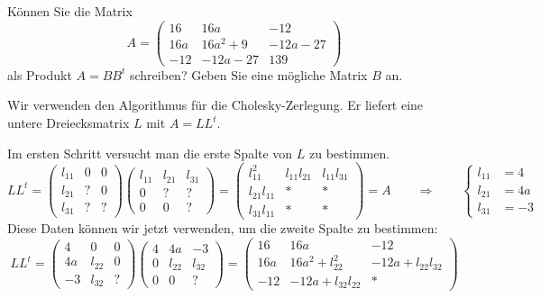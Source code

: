 Können Sie die Matrix
\[
A=\begin{pmatrix}
16& 16a&-12\\
16a&16a^2+9&-12a-27\\
-12& -12a-27&139
\end{pmatrix}
\]
als Produkt $A=BB^t$ schreiben? Geben Sie eine mögliche Matrix $B$ an.


\begin{loesung}
Wir verwenden den Algorithmus für die Cholesky-Zerlegung. Er liefert eine 
untere Dreiecksmatrix $L$ mit $A = LL^t$.

Im ersten Schritt versucht man die erste Spalte von $L$ zu bestimmen.
\[
LL^t=
\begin{pmatrix}
l_{11}&  0&  0\\
l_{21}&  ?&  0\\
l_{31}&  ?&  ?
\end{pmatrix}
\begin{pmatrix}
l_{11}&l_{21}&l_{31}\\
     0&     ?&     ?\\
     0&     0&     ?
\end{pmatrix}
=
\begin{pmatrix}
    l_{11}^2&l_{11}l_{21}&l_{11}l_{31}\\
l_{21}l_{11}&           *&           *\\
l_{31}l_{11}&           *&           *
\end{pmatrix}
=
A
\qquad\Rightarrow\qquad
\left\{
\begin{aligned}
l_{11}&=4\\
l_{21}&=4a\\
l_{31}&=-3
\end{aligned}
\right.
\]
Diese Daten können wir jetzt verwenden, um die zweite Spalte zu bestimmen:
\[
LL^t
=
\begin{pmatrix}
4&     0&0\\
4a&l_{22}&0\\
-3&l_{32}&?
\end{pmatrix}
\begin{pmatrix}
4&    4a&    -3\\
0&l_{22}&l_{32}\\
0&     0&?
\end{pmatrix}
=
\begin{pmatrix}
16&16a           &          -12\\
16a&16a^2+l_{22}^2  &-12a+l_{22}l_{32}\\
-12&-12a+l_{32}l_{22}&         *

\end{pmatrix}\]
\end{loesung}
